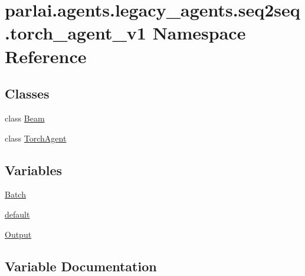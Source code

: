 \hypertarget{namespaceparlai_1_1agents_1_1legacy__agents_1_1seq2seq_1_1torch__agent__v1}{}\section{parlai.\+agents.\+legacy\+\_\+agents.\+seq2seq.\+torch\+\_\+agent\+\_\+v1 Namespace Reference}
\label{namespaceparlai_1_1agents_1_1legacy__agents_1_1seq2seq_1_1torch__agent__v1}
\subsection*{Classes}
\begin{DoxyCompactItemize}
\item 
class \hyperlink{classparlai_1_1agents_1_1legacy__agents_1_1seq2seq_1_1torch__agent__v1_1_1Beam}{Beam}
\item 
class \hyperlink{classparlai_1_1agents_1_1legacy__agents_1_1seq2seq_1_1torch__agent__v1_1_1TorchAgent}{Torch\+Agent}
\end{DoxyCompactItemize}
\subsection*{Variables}
\begin{DoxyCompactItemize}
\item 
\hyperlink{namespaceparlai_1_1agents_1_1legacy__agents_1_1seq2seq_1_1torch__agent__v1_a74cfde390a2b9861179ac0fcd59da28c}{Batch}
\item 
\hyperlink{namespaceparlai_1_1agents_1_1legacy__agents_1_1seq2seq_1_1torch__agent__v1_a5d17ee55b86a7e7ee0de4dca59bf3bdc}{default}
\item 
\hyperlink{namespaceparlai_1_1agents_1_1legacy__agents_1_1seq2seq_1_1torch__agent__v1_a2689006ea97d09413fb242f984bd8016}{Output}
\end{DoxyCompactItemize}


\subsection{Variable Documentation}
\mbox{\label{namespaceparlai_1_1agents_1_1legacy__agents_1_1seq2seq_1_1torch__agent__v1_a74cfde390a2b9861179ac0fcd59da28c}} 
